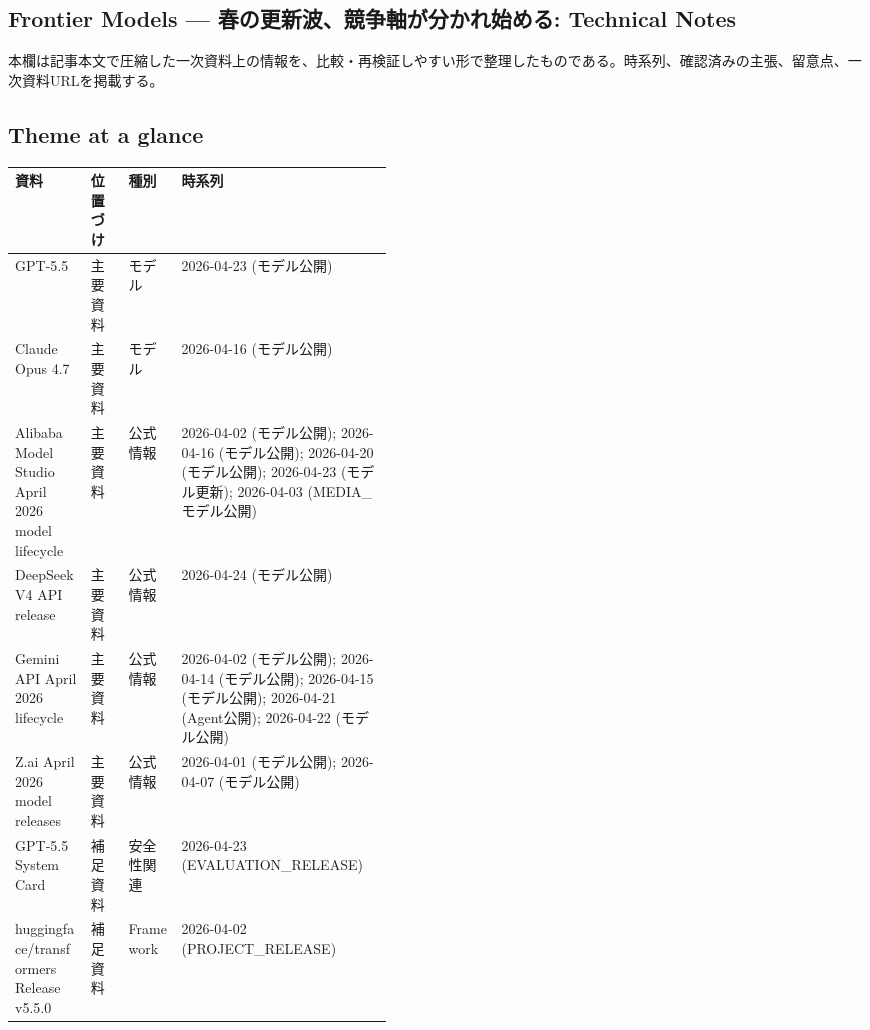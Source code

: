 \subsection*{Frontier Models — 春の更新波、競争軸が分かれ始める: Technical Notes}
本欄は記事本文で圧縮した一次資料上の情報を、比較・再検証しやすい形で整理したものである。時系列、確認済みの主張、留意点、一次資料URLを掲載する。
\medskip
\subsection*{Theme at a glance}
\begin{center}
\footnotesize
\begin{tabularx}{\linewidth}{@{}p{0.20\linewidth}p{0.10\linewidth}p{0.14\linewidth}X@{}}
\toprule
資料 & 位置づけ & 種別 & 時系列 \\
\midrule
GPT-5.5 & 主要資料 & モデル & 2026-04-23 (モデル公開) \\
Claude Opus 4.7 & 主要資料 & モデル & 2026-04-16 (モデル公開) \\
Alibaba Model Studio April 2026 model lifecycle & 主要資料 & 公式情報 & 2026-04-02 (モデル公開); 2026-04-16 (モデル公開); 2026-04-20 (モデル公開); 2026-04-23 (モデル更新); 2026-04-03 (MEDIA\_モデル公開) \\
DeepSeek V4 API release & 主要資料 & 公式情報 & 2026-04-24 (モデル公開) \\
Gemini API April 2026 lifecycle & 主要資料 & 公式情報 & 2026-04-02 (モデル公開); 2026-04-14 (モデル公開); 2026-04-15 (モデル公開); 2026-04-21 (Agent公開); 2026-04-22 (モデル公開) \\
Z.ai April 2026 model releases & 主要資料 & 公式情報 & 2026-04-01 (モデル公開); 2026-04-07 (モデル公開) \\
GPT-5.5 System Card & 補足資料 & 安全性関連 & 2026-04-23 (EVALUATION\_RELEASE) \\
huggingface/transformers Release v5.5.0 & 補足資料 & Framework & 2026-04-02 (PROJECT\_RELEASE) \\
\bottomrule
\end{tabularx}
\end{center}
\normalsize

